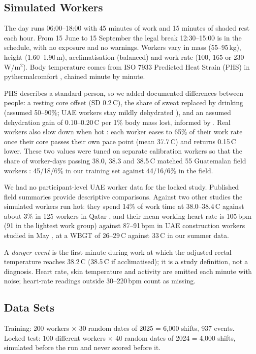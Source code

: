 \documentclass[conference,a4paper]{IEEEtran}
\begin{document}
\subsection{Simulated Workers}\label{sec:workers}
The day runs 06:00--18:00 with 45 minutes of work and 15 minutes of shaded rest each hour. From 15 June to 15 September the legal break 12:30--15:00 is in the schedule, with no exposure and no warnings. Workers vary in mass (55--95\,kg), height (1.60--1.90\,m), acclimatisation (balanced) and work rate (100, 165 or 230\,W/m$^2$). Body temperature comes from ISO 7933 Predicted Heat Strain (PHS) \cite{iso7933} in pythermalcomfort \cite{pythermal}, chained minute by minute.

PHS describes a standard person, so we added documented differences between people: a resting core offset (SD 0.2\,\textdegree C), the share of sweat replaced by drinking (assumed 50--90\%; UAE workers stay mildly dehydrated \cite{bates}), and an assumed dehydration gain of 0.10--0.20\,\textdegree C per 1\% body mass lost, informed by \cite{sawka}. Real workers also slow down when hot \cite{selfpacing}: each worker eases to 65\% of their work rate once their core passes their own pace point (mean 37.7\,\textdegree C) and returns 0.15\,\textdegree C lower. These two values were tuned on separate calibration workers so that the share of worker-days passing 38.0, 38.3 and 38.5\,\textdegree C matched 55 Guatemalan field workers \cite{krisher}: 45/18/6\% in our training set against 44/16/6\% in the field.

We had no participant-level UAE worker data for the locked study. Published field summaries provide descriptive comparisons. Against two other studies the simulated workers run hot: they spend 14\% of work time at 38.0--38.4\,\textdegree C against about 3\% in 125 workers in Qatar \cite{qatar}, and their mean working heart rate is 105\,bpm (91 in the lightest work group) against 87--91\,bpm in UAE construction workers studied in May \cite{bates}, at a WBGT of 26--29\,\textdegree C against 33\,\textdegree C in our summer data.

A \emph{danger event} is the first minute during work at which the adjusted rectal temperature reaches 38.2\,\textdegree C (38.5\,\textdegree C if acclimatised); it is a study definition, not a diagnosis. Heart rate, skin temperature and activity are emitted each minute with noise; heart-rate readings outside 30--220\,bpm count as missing.

\subsection{Data Sets}
Training: 200 workers $\times$ 30 random dates of 2025 = 6,000 shifts, 937 events. Locked test: 100 different workers $\times$ 40 random dates of 2024 = 4,000 shifts, simulated before the run and never scored before it.
\end{document}
